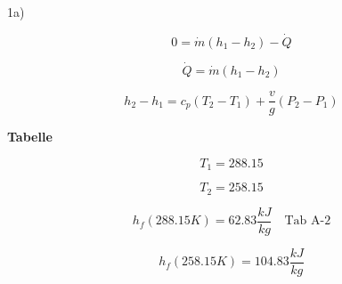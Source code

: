 1a)

\[
0 = \dot{m} (h_1 - h_2) - \dot{Q}
\]

\[
\dot{Q} = \dot{m} (h_1 - h_2)
\]

\[
h_2 - h_1 = c_p (T_2 - T_1) + \frac{v}{g} (P_2 - P_1)
\]

\textbf{Tabelle}

\[
T_1 = 288.15
\]

\[
T_2 = 258.15
\]

\[
h_f (288.15 K) = 62.83 \frac{kJ}{kg} \quad \text{Tab A-2}
\]

\[
h_f (258.15 K) = 104.83 \frac{kJ}{kg}
\]